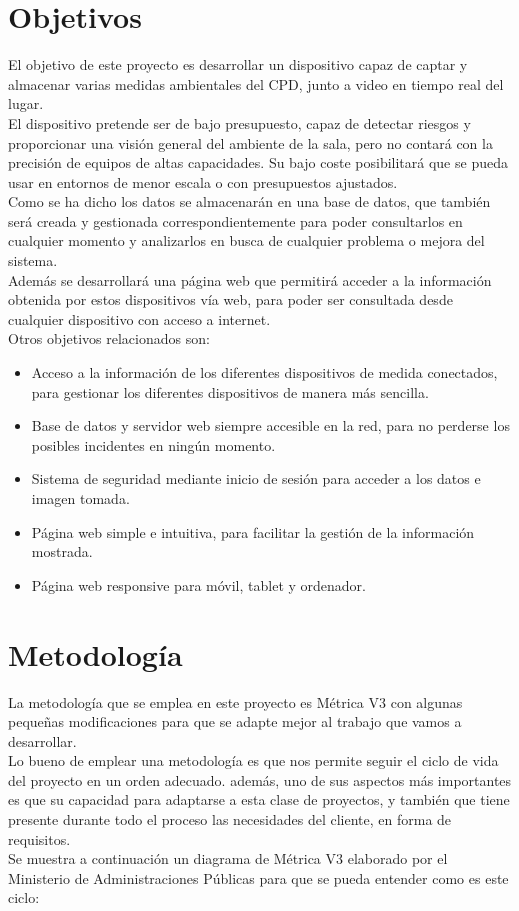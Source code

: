 \section{Objetivos}
El objetivo de este proyecto es desarrollar un dispositivo capaz de captar y almacenar varias medidas ambientales del CPD, junto a video en tiempo real del lugar. \\ El dispositivo pretende ser de bajo presupuesto, capaz de detectar riesgos y proporcionar una visión general del ambiente de la sala, pero no contará con la precisión de equipos de altas capacidades. Su bajo coste posibilitará que se pueda usar en entornos de menor escala o con presupuestos ajustados.  \\ Como se ha dicho los datos se almacenarán en una base de datos, que también será creada y gestionada correspondientemente para poder consultarlos en cualquier momento y analizarlos en busca de cualquier problema o mejora del sistema. \\ Además se desarrollará una página web que permitirá acceder a la información obtenida por estos dispositivos vía web, para poder ser consultada desde cualquier dispositivo con acceso a internet. \\ Otros objetivos relacionados son:
\begin{itemize}
    \item Acceso a la información de los diferentes dispositivos de medida conectados, para gestionar los diferentes dispositivos de manera más sencilla.
    \item Base de datos y servidor web siempre accesible en la red, para no perderse los posibles incidentes en ningún momento.
    \item Sistema de seguridad mediante inicio de sesión para acceder a los datos e imagen tomada.
    \item Página web simple e intuitiva, para facilitar la gestión de la información mostrada.
    \item Página web responsive para móvil, tablet y ordenador.
\end{itemize}

\section{Metodología}
La metodología que se emplea en este proyecto es Métrica V3 \cite{portal_administracion_electronica_metrica_nodate} con algunas pequeñas modificaciones para que se adapte mejor al trabajo que vamos a desarrollar. \\ Lo bueno de emplear una metodología es que nos permite seguir el ciclo de vida del proyecto en un orden adecuado. además, uno de sus aspectos más importantes es que su capacidad para adaptarse a esta clase de proyectos, y también que tiene presente durante todo el proceso las necesidades del cliente, en forma de requisitos. \\ Se muestra a continuación un diagrama de Métrica V3 elaborado por el Ministerio de Administraciones Públicas para que se pueda entender como es este ciclo:


